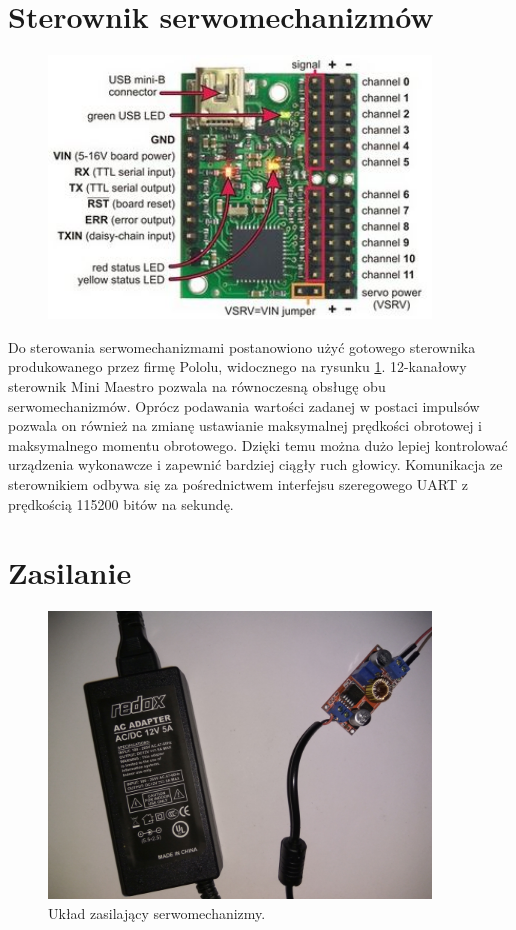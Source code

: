 \section{Sterownik serwomechanizmów}
\label{sec:sterownik}

\begin{figure}[h]
	\centering
	\includegraphics[width=4in]{maestro.jpg}
	\label{fig:maestro}
\end{figure}

Do sterowania serwomechanizmami postanowiono użyć gotowego sterownika produkowanego przez firmę Pololu, widocznego na rysunku \ref{fig:maestro}.
12-kanałowy sterownik Mini Maestro pozwala na równoczesną obsługę obu serwomechanizmów. 
Oprócz podawania wartości zadanej w postaci impulsów pozwala on również na zmianę ustawianie maksymalnej prędkości obrotowej i maksymalnego momentu obrotowego. 
Dzięki temu można dużo lepiej kontrolować urządzenia wykonawcze i zapewnić bardziej ciągły ruch głowicy. 
Komunikacja ze sterownikiem odbywa się za pośrednictwem interfejsu szeregowego UART z prędkością 115200 bitów na sekundę.

\section{Zasilanie}
\label{sec:zasilanie}

\begin{figure}[H]
	\centering
	\includegraphics[width=4in]{zasilanie.jpg}
	\caption{Układ zasilający serwomechanizmy.}
	\label{fig:zasilanie}
\end{figure}

